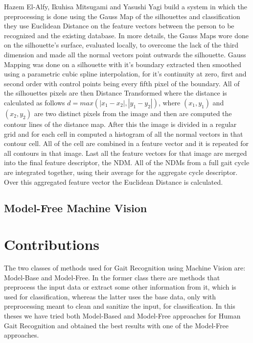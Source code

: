\documentclass[12pt]{article}
\theoremstyle{definition}
\begin{document}
	Hazem El-Alfy, Ikuhisa Mitsugami and Yasushi Yagi \cite{gait-with-curvature-map} build a system in which the preprocessing is done using the Gauss Map of the silhouettes and classification they use Euclidean Distance on the feature vectors between the person to be recognized and the existing database. In more details, the Gauss Maps wore done on the silhouette's surface, evaluated locally, to overcome the lack of the third dimension and made all the normal vectors point outwards the silhouette. Gauss Mapping was done on a silhouette with it's boundary extracted then smoothed using a parametric cubic spline interpolation, for it's continuity at zero, first and second order with control points being every fifth pixel of the boundary. All of the silhouettes pixels are then Distance Transformed where the distance is calculated as follows $d=max(|x_1-x_2|, |y_1-y_2|)$, where $(x_1, y_1)$ and $(x_2, y_2)$ are two distinct pixels from the image and then are computed the contour lines of the distance map. After this the image is divided in a regular grid and for each cell in computed a histogram of all the normal vectors in that contour cell. All of the cell are combined in a feature vector and it is repeated for all contours in that image. Last all the feature vectors for that image are merged into the final feature descriptor, the NDM. All of the NDMs from a full gait cycle are integrated together, using their average for the aggregate cycle descriptor. Over this aggregated feature vector the Euclidean Distance is calculated.

	\subsection{Model-Free Machine Vision}

	\newpage

	\section{Contributions}
	\vspace{1cm}

	The two classes of methods used for Gait Recognition using Machine Vision are: Model-Base and Model-Free. In the former class there are methods that preprocess the input data or extract some other information from it, which is used for classification, whereas the latter uses the base data, only with preprocessing meant to clean and sanitize the input, for classification. In this theses we have tried both Model-Based and Model-Free approaches for Human Gait Recognition and obtained the best results with one of the Model-Free approaches.
\end{document}
